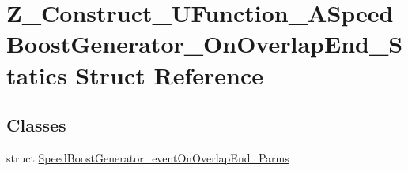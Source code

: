 \hypertarget{struct_z___construct___u_function___a_speed_boost_generator___on_overlap_end___statics}{}\section{Z\+\_\+\+Construct\+\_\+\+U\+Function\+\_\+\+A\+Speed\+Boost\+Generator\+\_\+\+On\+Overlap\+End\+\_\+\+Statics Struct Reference}
\label{struct_z___construct___u_function___a_speed_boost_generator___on_overlap_end___statics}
\subsection*{Classes}
\begin{DoxyCompactItemize}
\item 
struct \mbox{\hyperlink{struct_z___construct___u_function___a_speed_boost_generator___on_overlap_end___statics_1_1_speed3abca8d0eca565059cbc14200328307a}{Speed\+Boost\+Generator\+\_\+event\+On\+Overlap\+End\+\_\+\+Parms}}
\end{DoxyCompactItemize}
